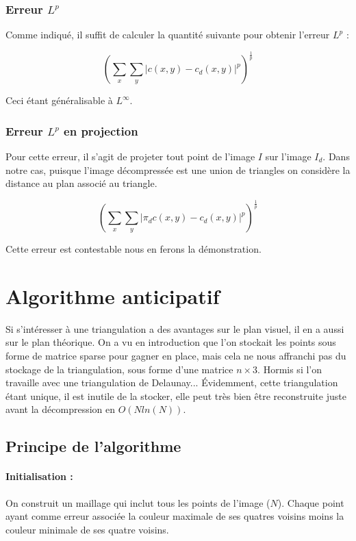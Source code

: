 \documentclass{report}
\begin{document}
\subsubsection{Erreur $L^p$}

Comme indiqué, il suffit de calculer la quantité suivante pour obtenir l'erreur $L^p$ :

$$ (\sum_x \sum_y \vert c(x,y) - c_d(x, y) \vert^p )^{\frac{1}{p}} $$

Ceci étant généralisable à $L^\infty$.

\subsubsection{Erreur $L^p$ en projection}

Pour cette erreur, il s'agit de projeter tout point de l'image $I$ sur l'image $I_d$. Dans notre cas, puisque l'image décompressée est une union de triangles on considère la distance au plan associé au triangle.

$$ (\sum_x \sum_y \vert \pi_d c(x,y) - c_d(x, y) \vert^p )^{\frac{1}{p}} $$

Cette erreur est contestable nous en ferons la démonstration.

\section{Algorithme anticipatif}

Si s'intéresser à une triangulation a des avantages sur le plan visuel, il en a aussi sur le plan théorique. On a vu en introduction que l'on stockait les points sous forme de matrice sparse pour gagner en place, mais cela ne nous affranchi pas du stockage de la triangulation, sous forme d'une matrice $n \times 3$. Hormis si l'on travaille avec une triangulation de Delaunay... Évidemment, cette triangulation étant unique, il est inutile de la stocker, elle peut très bien être reconstruite juste avant la décompression en $O(N ln(N))$.

\subsection{Principe de l'algorithme}

\paragraph{Initialisation :}

On construit un maillage qui inclut tous les points de l'image ($N$). Chaque point ayant comme erreur associée la couleur maximale de ses quatres voisins moins la couleur minimale de ses quatre voisins.
\end{document}
